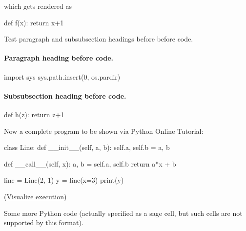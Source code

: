 \documentclass[%
oneside,                 %
final,                   %
10pt]{article}
\theoremstyle{definition}
\begin{document}
\edo

which gets rendered as




\bpycod
def f(x):
    return x+1

\epycod


Test paragraph and subsubsection headings before
before code.

\paragraph{Paragraph heading before code.}




\bpycod
import sys
sys.path.insert(0, os.pardir)

\epycod


\paragraph{Subsubsection heading before code.}



\bpycod
def h(z):
    return z+1

\epycod


Now a complete program to be shown via Python Online Tutorial:













\bpypro
class Line:
    def __init__(self, a, b):
        self.a, self.b = a, b

    def __call__(self, x):
        a, b = self.a, self.b
        return a*x + b

line = Line(2, 1)
y = line(x=3)
print(y)

\epypro

\noindent
(\href{{https://pythontutor.com/visualize.html\#code=class+Line\%3A\%0A++++def+__init__\%28self\%2C+a\%2C+b\%29\%3A\%0A++++++++self.a\%2C+self.b+\%3D+a\%2C+b\%0A\%0A++++def+__call__\%28self\%2C+x\%29\%3A\%0A++++++++a\%2C+b+\%3D+self.a\%2C+self.b\%0A++++++++return+a\%2Ax+\%2B+b\%0A\%0Aline+\%3D+Line\%282\%2C+1\%29\%0Ay+\%3D+line\%28x\%3D3\%29\%0Aprint\%28y\%29&mode=display&cumulative=false&heapPrimitives=false&drawParentPointers=false&textReferences=false&py=2&curInstr=0}}{Visualize execution}) 


Some more Python code (actually specified as a sage cell, but
such cells are not supported by this format).
\end{document}
